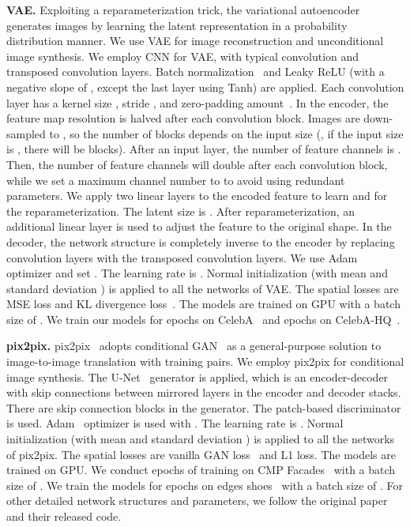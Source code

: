 \documentclass[10pt,twocolumn,letterpaper]{article}
\begin{document}
\vspace{0.05cm}
\noindent
\textbf{VAE.}
Exploiting a reparameterization trick, the variational autoencoder~\cite{vae} generates images by learning the latent representation in a probability distribution manner.
We use VAE for image reconstruction and unconditional image synthesis.
We employ CNN for VAE, with typical convolution and transposed convolution layers. Batch normalization~\cite{BN} and Leaky ReLU (with a negative slope of , except the last layer using Tanh) are applied. Each convolution layer has a kernel size , stride , and zero-padding amount~.
In the encoder, the feature map resolution is halved after each convolution block. Images are down-sampled to , so the number of blocks depends on the input size (\eg, if the input size is , there will be  blocks). After an input layer, the number of feature channels is . Then, the number of feature channels will double after each convolution block, while we set a maximum channel number to  to avoid using redundant parameters.
We apply two linear layers to the encoded feature to learn  and  for the reparameterization. The latent size is . After reparameterization, an additional linear layer is used to adjust the feature to the original shape.
In the decoder, the network structure is completely inverse to the encoder by replacing convolution layers with the transposed convolution layers.
We use Adam~\cite{adam} optimizer and set . The learning rate is . Normal initialization (with mean  and standard deviation ) is applied to all the networks of VAE.
The spatial losses are MSE loss and KL divergence loss~\cite{vae}.
The models are trained on  GPU with a batch size of .
We train our models for  epochs on CelebA~\cite{celeba} and  epochs on CelebA-HQ~\cite{pggan}.


\vspace{0.05cm}
\noindent
\textbf{pix2pix.}
pix2pix~\cite{pix2pix} adopts conditional GAN~\cite{congan} as a general-purpose solution to image-to-image translation with training pairs.
We employ pix2pix for conditional image synthesis.
The U-Net~\cite{unet} generator is applied, which is an encoder-decoder with skip connections between mirrored layers in the encoder and decoder stacks. There are  skip connection blocks in the generator.
The patch-based discriminator is used.
Adam~\cite{adam} optimizer is used with . The learning rate is . Normal initialization (with mean  and standard deviation ) is applied to all the networks of pix2pix.
The spatial losses are vanilla GAN loss~\cite{GAN} and L1 loss.
The models are trained on  GPU.
We conduct  epochs of training on CMP Facades~\cite{cmpfacades} with a batch size of . We train the models for  epochs on edges  shoes~\cite{shoesutzappos50K} with a batch size of .
For other detailed network structures and parameters, we follow the original paper~\cite{pix2pix} and their released code.
\end{document}
